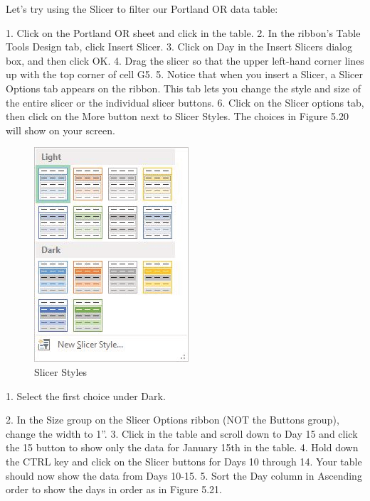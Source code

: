 Let’s try using the Slicer to filter our Portland OR data table:

1. Click on the Portland OR sheet and click in the table.
2. In the ribbon’s Table Tools Design tab, click Insert Slicer.
3. Click on Day in the Insert Slicers dialog box, and then click OK.
4. Drag the slicer so that the upper left-hand corner lines up with the top corner of cell G5.
5. Notice that when you insert a Slicer, a Slicer Options tab appears on the ribbon. This tab lets
you change the style and size of the entire slicer or the individual slicer buttons.
6. Click on the Slicer options tab, then click on the More button next to Slicer Styles. The choices
in Figure 5.20 will show on your screen.

\begin{figure}[H]
	\centering
	\includegraphics[width=\maxwidth{.95\linewidth}]{gfx/ch05_fig20}
	\caption{Slicer Styles}
	\label{05:fig20}
\end{figure}






1. Select the first choice under Dark.


2. In the Size group on the Slicer Options ribbon (NOT the Buttons group), change the width to 1”.
3. Click in the table and scroll down to Day 15 and click the 15 button to show only the data for
January 15th in the table.
4. Hold down the CTRL key and click on the Slicer buttons for Days 10 through 14. Your table
should now show the data from Days 10-15.
5. Sort the Day column in Ascending order to show the days in order as in Figure 5.21.


